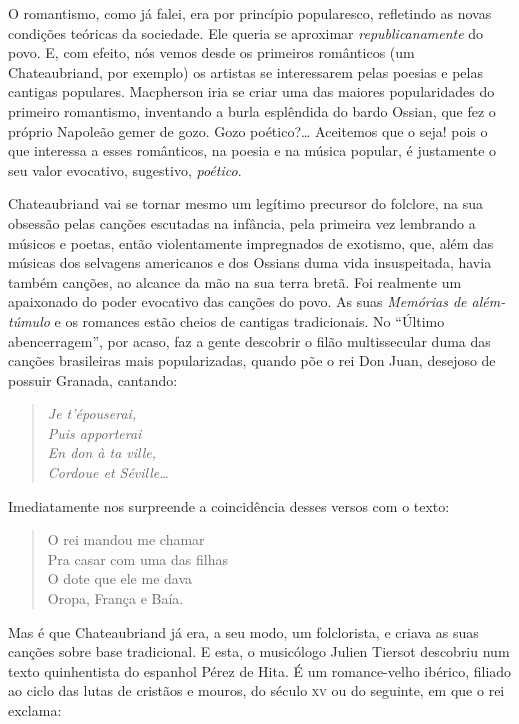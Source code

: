 O romantismo, como já falei, era por princípio popularesco, refletindo
as novas condições teóricas da sociedade. Ele queria se aproximar
\textit{republicanamente} do povo. E, com efeito, nós vemos desde os primeiros
românticos (um Chateaubriand, por exemplo) os artistas se interessarem
pelas poesias e pelas cantigas populares. Macpherson iria se criar uma
das maiores popularidades do primeiro romantismo, inventando a burla
esplêndida do bardo Ossian, que fez o próprio Napoleão gemer de gozo.
Gozo poético?\ldots{} Aceitemos que o seja! pois o que interessa a esses
românticos, na poesia e na música popular, é justamente o seu valor
evocativo, sugestivo, \textit{poético}.

Chateaubriand vai se tornar mesmo um legítimo precursor do folclore, na
sua obsessão pelas canções escutadas na infância, pela primeira vez
lembrando a músicos e poetas, então violentamente impregnados de
exotismo, que, além das músicas dos selvagens americanos e dos Ossians
duma vida insuspeitada, havia também canções, ao alcance da mão na sua
terra bretã. Foi realmente um apaixonado do poder evocativo das canções
do povo. As suas \textit{Memórias de além-túmulo} e os romances estão cheios de
cantigas tradicionais. No ``Último abencerragem'', por acaso, faz a gente
descobrir o filão multissecular duma das canções brasileiras mais
popularizadas, quando põe o rei Don Juan, desejoso de possuir Granada,
cantando:

\begin{verse}
\small{
\textit{Je t'épouserai,\\
Puis apporterai\\
En don à ta ville,\\
Cordoue et Séville\ldots{}}}
\end{verse}

Imediatamente nos surpreende a coincidência desses versos com o texto:

\begin{verse}
\small{
O rei mandou me chamar\\
Pra casar com uma das filhas\\
O dote que ele me dava\\
Oropa, França e Baía.}
\end{verse}

Mas é que Chateaubriand já era, a seu modo, um folclorista, e criava as
suas canções sobre base tradicional. E esta, o musicólogo Julien Tiersot
descobriu num texto quinhentista do espanhol Pérez de Hita. É um
romance-velho ibérico, filiado ao ciclo das lutas de cristãos e mouros,
do século \textsc{xv} ou do seguinte, em que o rei exclama:

